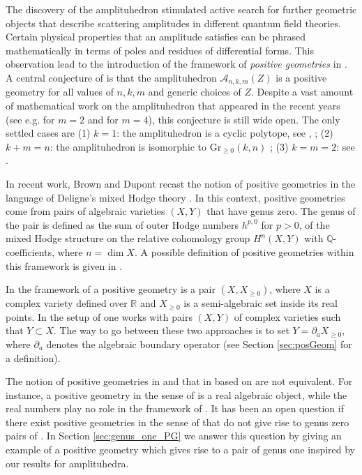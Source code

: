 \documentclass[12pt]{extarticle}
\theoremstyle{definition}
\theoremstyle{theorem}
\theoremstyle{remark}
\numberwithin{equation}{section}
\newcommand{\Q}{\mathbb{Q}}
\begin{document}
The discovery of the amplituhedron stimulated active search for further geometric objects that describe scattering amplitudes in different quantum field theories. 
Certain physical properties that an amplitude satisfies can be phrased mathematically in terms of poles and residues of differential forms. 
This observation lead to the introduction of the framework of \emph{positive geometries} in \cite{pos_geom_2017}. 
A central conjecture of \cite{pos_geom_2017} is that the amplituhedron $\mathcal{A}_{n,k,m}(Z)$ is a positive geometry for all values of $n,k,m$ and generic choices of $Z$. 
Despite a vast amount of mathematical work on the amplituhedron that appeared in the recent years (see e.g. \cite{parisi:meq2, lukowski2023meq2, parisi2024magic, lam_face_structure} for $m=2$ and \cite{amplituhedronbcfwtriangulation, meq4} for $m=4$), this conjecture is still wide open. 
The only settled cases are (1) $k=1$: the amplituhedron is a cyclic polytope, see \cite{bernd1988}, \cite[Theorem 1]{lam2024invitation}; (2) $k+m=n$: the amplituhedron is isomorphic to $\mathrm{Gr}_{\geq 0}(k,n)$ \cite[Theorem 9]{lam2024invitation}; (3) $k=m=2$: see \cite[Theorem 1.3]{amplituhedron_adjoint}. 

In recent work, Brown and Dupont \cite{brown-dupont} recast the notion of positive geometries in the language of Deligne's mixed Hodge theory \cite{Deligne1971}. In this context, positive geometries come from pairs of algebraic varieties $(X,Y)$ that have genus zero.
The genus of the pair is defined as the sum of outer Hodge numbers $h^{p,0}$ for $p>0$, of the mixed Hodge structure on the relative cohomology group $H^n(X,Y)$ with $\Q$-coefficients, where $n=\dim X$. A possible definition of positive geometries within this framework is given in \cite[Definition 1.13]{telen2025positivegeometrypolytopespolypols}.

In the framework of \cite{pos_geom_2017} a positive geometry is a pair $(X,X_{\geq 0})$, where $X$ is a complex variety defined over $\mathbb{R}$ and $X_{\geq 0}$ is a semi-algebraic set inside its real points. In the setup of \cite{brown-dupont} one works with pairs $(X,Y)$ of complex varieties such that $Y\subset X$. The way to go between these two approaches is to set $Y=\partial_a X_{\geq 0}$, where $\partial_a$ denotes the algebraic boundary operator (see Section \ref{sec:posGeom} for a definition). 

The notion of positive geometries in \cite{pos_geom_2017} and that in \cite{telen2025positivegeometrypolytopespolypols} based on \cite{brown-dupont} are not equivalent. For instance, a positive geometry in the sense of \cite{pos_geom_2017} is a real algebraic object, while the real numbers play no role in the framework of \cite{brown-dupont}.
It has been an open question if there exist positive geometries in the sense of \cite{pos_geom_2017} that do not give rise to genus zero pairs of \cite{brown-dupont}.
In Section \ref{sec:genus_one_PG} we answer this question by giving an example of a positive geometry which gives rise to a pair of genus one inspired by our results for amplituhedra.
\end{document}
